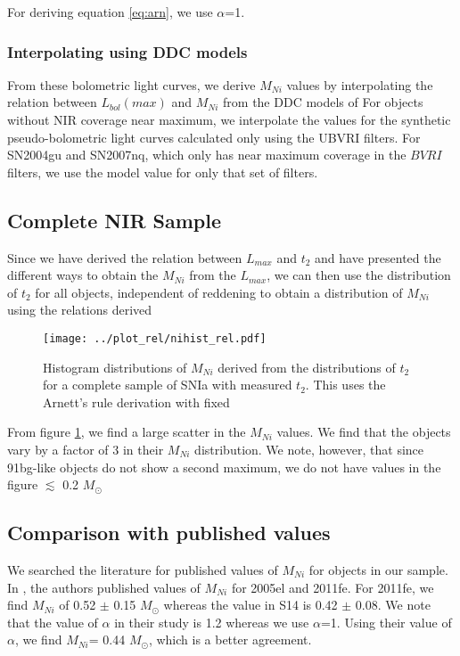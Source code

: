 For deriving equation \eqref{eq:arn}, we use $\alpha$=1. 

\subsubsection{Interpolating using DDC models}
From these bolometric light curves, we derive $M_{Ni}$ values by interpolating the relation between  $L_{bol}(max)$ and $M_{Ni}$ from the DDC models of \citet{Blondin2013}
For objects without NIR coverage near maximum, we interpolate the values for the synthetic pseudo-bolometric light curves 
calculated only using the UBVRI filters. For SN2004gu and SN2007nq, which only has near maximum coverage in the $BVRI$ filters, we use the model value for only that set of filters. 

\subsection{Complete NIR Sample}
Since we have derived the relation between $L_{max}$ and $t_2$ and have presented the different ways to obtain the $M_{Ni}$ from the $L_{max}$, we can then use the distribution of $t_2$ for all objects, independent of reddening to obtain a distribution of $M_{Ni}$ using the relations derived

\begin{figure}
\texttt{[image: ../plot\_rel/nihist\_rel.pdf]}
\caption{Histogram distributions of $M_{Ni}$ derived from the distributions of $t_2$ for a complete sample of SNIa with measured $t_2$. This uses the Arnett's rule derivation with fixed }
\label{fig:hist}
\end{figure}

From figure \ref{fig:hist}, we find a large scatter in the $M_{Ni}$ values. We find that the objects vary by a factor of 3 in their $M_{Ni}$ distribution. We note, however, that since 91bg-like objects do not show a second maximum, we do not have values in the figure $\lesssim$ 0.2 $M_{\odot}$

\subsection{Comparison with published values}
We searched the literature for published values of $M_{Ni}$ for objects in our sample. In \citet{Scalzo2014} , the authors published values of $M_{Ni}$ for 2005el and 2011fe. For 2011fe, we find $M_{Ni}$ of 0.52 $\pm$ 0.15 $M_{\odot}$ whereas the value in S14 is 0.42 $\pm$ 0.08. We note that the value of $\alpha$ in their study is 1.2 whereas we use $\alpha$=1. Using their value of $\alpha$, we find $M_{Ni}$= 0.44 $M_{\odot}$, which is a better agreement. 


